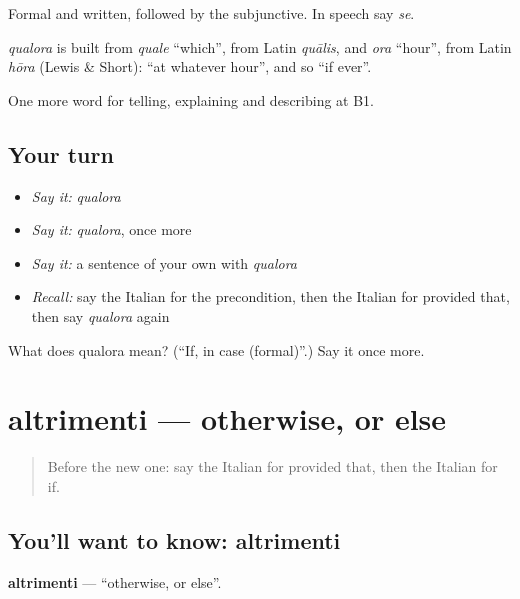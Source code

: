 Formal and written, followed by the subjunctive. In speech say \emph{se}.

\begin{cousinweb}
\emph{qualora} is built from \emph{quale} \textquotedblleft{}which\textquotedblright{}, from Latin \emph{quālis}, and \emph{ora} \textquotedblleft{}hour\textquotedblright{}, from Latin \emph{hōra} (Lewis \& Short): \textquotedblleft{}at whatever hour\textquotedblright{}, and so \textquotedblleft{}if ever\textquotedblright{}.
\end{cousinweb}

\begin{grammarlens}[title={What you've built}]
One more word for telling, explaining and describing at B1.
\end{grammarlens}

\subsection*{Your turn}
\begin{itemize}
\raggedright
  \item \emph{Say it:} \emph{qualora}
  \item \emph{Say it:} \emph{qualora}, once more
  \item \emph{Say it:} a sentence of your own with \emph{qualora}
  \item \emph{Recall:} say the Italian for the precondition, then the Italian for provided that, then say \emph{qualora} again
\end{itemize}

\begin{tcolorbox}[breakable,colback=teal!4,colframe=teal!35!black,title={Before you move on}]
What does qualora mean? (\textquotedblleft{}If, in case (formal)\textquotedblright{}.) Say it once more.
\end{tcolorbox}
\section[altrimenti]{altrimenti — otherwise, or else}

\label{lesson:IT-C373-altrimenti}



\begin{quote}
Before the new one: say the Italian for provided that, then the Italian for if.
\end{quote}

\subsection*{You'll want to know: altrimenti}
\textbf{altrimenti} — \textquotedblleft{}otherwise, or else\textquotedblright{}.

